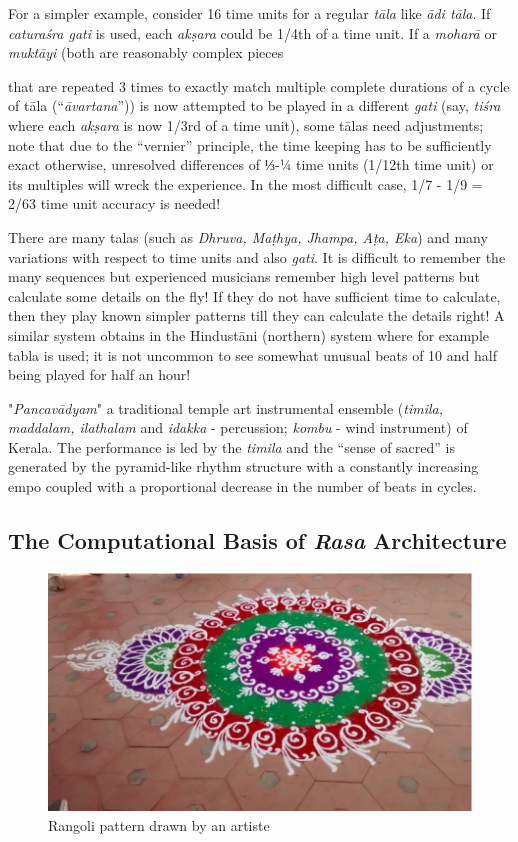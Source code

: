 For a simpler example, consider 16 time units for a regular \textsl{tāla} like \textsl{ādi tāla}. If \textsl{caturaśra gati} is used, each \textsl{akṣara} could be 1/4th of a time unit. If a \textsl{moharā} or \textsl{muktāyi} (both are reasonably complex pieces 

that are repeated 3 times to exactly match multiple complete durations of a cycle of tāla (“\textsl{āvartana}”)) is now attempted to be played in a different \textsl{gati} (say, \textsl{tiśra} where each \textsl{akṣara} is now 1/3rd of a time unit), some tālas need adjustments; note that due to the “vernier” principle, the time keeping has to be sufficiently exact otherwise, unresolved differences of ⅓-¼ time units (1/12th time unit) or its multiples will wreck the experience. In the most difficult case, 1/7 - 1/9 = 2/63 time unit accuracy is needed!

There are many talas (such as \textsl{Dhruva, Maṭhya, Jhampa, Aṭa, Eka}) and many variations with respect to time units and also \textsl{gati}. It is difficult to remember the many sequences but experienced musicians remember high level patterns but calculate some details on the fly! If they do not have sufficient time to calculate, then they play known simpler patterns till they can calculate the details right! A similar system obtains in the Hindustāni (northern) system where for example tabla is used; it is not uncommon to see somewhat unusual beats of 10 and half being played for half an hour! 

"\textsl{Pancavādyam}" a traditional temple art instrumental ensemble (\textsl{timila, maddalam, ilathalam} and \textsl{idakka} - percussion; \textsl{kombu} - wind instrument) of Kerala. The performance is led by the \textsl{timila} and the “sense of sacred” is generated by the pyramid-like rhythm structure with a constantly increasing empo coupled with a proportional decrease in the number of beats in cycles.

\subsection*{The Computational Basis of \textsl{Rasa} Architecture}\label{chap7-sec5.3}

\begin{figure}[H]
\centering
\includegraphics[scale=.8]{figures/8.eps}
\caption{Rangoli pattern drawn by an artiste}\label{chap7-fig6}
\end{figure}

